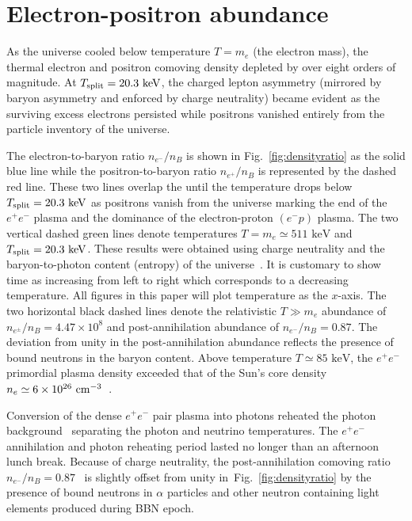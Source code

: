 \documentclass[reprint]{revtex4-2}
\newcommand*{\keV}{\text{ keV}}
\newcommand{\rf}[1]{Fig.~{\ref{#1}}}
\begin{document}
\section{Electron-positron abundance}
\label{sec:abundance}
\noindent As the universe cooled below temperature $T=m_{e}$ (the electron mass), the thermal electron and positron comoving density depleted by over eight orders of magnitude. At $T_{\rm split}=20.3\keV$, the charged lepton asymmetry (mirrored by baryon asymmetry and enforced by charge neutrality) became evident as the surviving excess electrons persisted while positrons vanished entirely from the particle inventory of the universe.

The electron-to-baryon ratio $n_{e^{-}}/n_{B}$ is shown in \rf{fig:densityratio} as the solid blue line while the positron-to-baryon ratio $n_{e^{+}}/n_{B}$ is represented by the dashed red line. These two lines overlap the until the temperature drops below $T_{\rm split}=20.3\keV$ as positrons vanish from the universe marking the end of the $e^{+}e^{-}$ plasma and the dominance of the electron-proton $(e^{-}p)$ plasma. The two vertical dashed green lines denote temperatures $T=m_{e}\simeq511\keV$ and $T_{\rm split}=20.3\keV$. These results were obtained using charge neutrality and the baryon-to-photon content (entropy) of the universe~\cite{rafelski2023short}. It is customary to show time as increasing from left to right which corresponds to a decreasing temperature. All figures in this paper will plot temperature as the $x$-axis. The two horizontal black dashed lines denote the relativistic $T\gg m_e$ abundance of $n_{e^{\pm}}/n_{B}=4.47\times10^{8}$ and post-annihilation abundance of  $n_{e^{-}}/n_{B}=0.87$. The deviation from unity in the post-annihilation abundance reflects the presence of bound neutrons in the baryon content. Above temperature $T\simeq85\keV$, the $e^{+}e^{-}$ primordial plasma density exceeded that of the Sun's core density $n_{e}\simeq6\times10^{26}{\rm\ cm}^{-3}$~\cite{bahcall2001solar}. 

Conversion of the dense $e^{+}e^{-}$ pair plasma into photons reheated the photon background~\cite{birrell2014relic} separating the photon and neutrino temperatures. The $e^{+}e^{-}$ annihilation and photon reheating period lasted no longer than an afternoon lunch break. Because of charge neutrality, the post-annihilation comoving ratio $n_{e^{-}}/n_{B}=0.87$~\cite{rafelski2023short} is slightly offset from unity in~\rf{fig:densityratio} by the presence of bound neutrons in $\alpha$ particles and  other neutron containing light elements produced during BBN epoch. 
\end{document}
